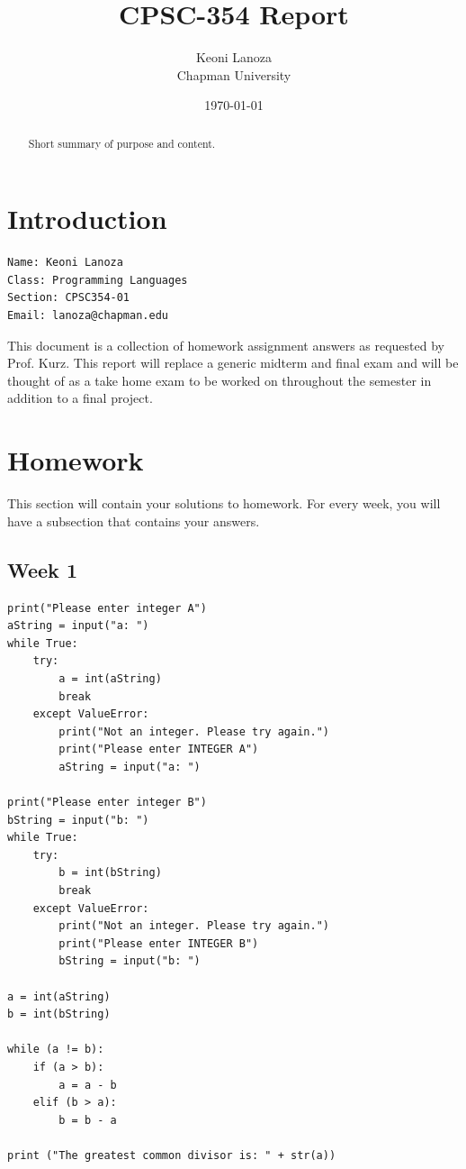 \documentclass{article}
\title{CPSC-354 Report}
\author{Keoni Lanoza  \\ Chapman University}
\date{\today}
\theoremstyle{theorem}
\theoremstyle{definition}
\theoremstyle{remark}
\begin{document}
\maketitle

\begin{abstract}
Short  summary of purpose and content.  
\end{abstract}

\tableofcontents

\section{Introduction}\label{intro}

\begin{verbatim}
Name: Keoni Lanoza
Class: Programming Languages
Section: CPSC354-01
Email: lanoza@chapman.edu
\end{verbatim}

This document is a collection of homework assignment answers as requested by Prof. Kurz. This report will replace a generic midterm and final exam and will be thought of as a take home exam to be worked on throughout the semester in addition to a final project.



\section{Homework}\label{homework}

This section will contain your solutions to homework.
For every week, you will have a subsection that contains your answers.

\subsection{Week 1}

\begin{verbatim}
print("Please enter integer A")
aString = input("a: ")
while True:
    try: 
        a = int(aString)
        break
    except ValueError:
        print("Not an integer. Please try again.")
        print("Please enter INTEGER A")
        aString = input("a: ")
    
print("Please enter integer B")
bString = input("b: ")
while True:
    try: 
        b = int(bString)
        break
    except ValueError:
        print("Not an integer. Please try again.")
        print("Please enter INTEGER B")
        bString = input("b: ")

a = int(aString)
b = int(bString)

while (a != b):
    if (a > b):
        a = a - b
    elif (b > a):
        b = b - a
        
print ("The greatest common divisor is: " + str(a))
\end{verbatim}
\end{document}
